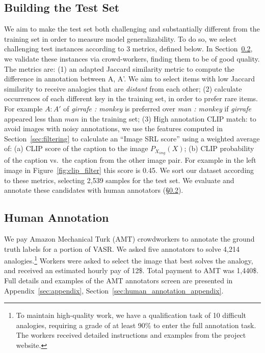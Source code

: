\documentclass[letterpaper]{article} \usepackage{aaai23}  \usepackage{times}  \usepackage{helvet}  \usepackage{courier}  \usepackage[hyphens]{url}  \usepackage{graphicx} \urlstyle{rm} \def\UrlFont{\rm}  \usepackage{natbib}  \usepackage{caption} \frenchspacing  \setlength{\pdfpagewidth}{8.5in}  \setlength{\pdfpageheight}{11in}  \usepackage{algorithm}
\begin{document}
\subsection{Building the Test Set}
\label{sec:candidates_gold}
We aim to make the test set both challenging and substantially different from the training set in order to measure model generalizability. To do so, we select challenging test instances according to 3 metrics, defined below. In Section~\ref{sec:mturk}, we validate these instances via crowd-workers, finding them to be of good quality.
The metrics are: (1) an adapted Jaccard similarity metric to compute the difference in annotation between A, A'. We aim to select items with low Jaccard similarity to receive analogies that are \emph{distant} from each other; (2) calculate occurrences of each different key in the training set, in order to prefer rare items. For example $A:A'$ of \textit{girrafe : monkey} is preferred over \textit{man : monkey} if \textit{girrafe} appeared less than $man$ in the training set; (3) High annotation CLIP match: to avoid images with noisy annotations, we use the features computed in Section~\ref{sec:filtering} to calculate an ``Image SRL score'' using a weighted average of: (a) CLIP score of the caption to the image $P_{X_{img}}(X)$; (b) CLIP probability of the caption vs.~the caption from the other image pair. For example in the left image in Figure~\ref{fig:clip_filter} this score is 0.45. 
We sort our dataset according to these metrics, selecting 2,539 samples for the test set. We evaluate and annotate these candidates with human annotators (\S\ref{sec:mturk}).

\subsection{Human Annotation}
\label{sec:mturk}
We pay Amazon Mechanical Turk (AMT) crowdworkers to annotate the ground truth labels for a portion of VASR. We asked five annotators to solve 4,214 analogies.\footnote{To maintain high-quality work, we have a qualification task of 10 difficult analogies, requiring a grade of at least 90\% to enter the full annotation task. The workers received detailed instructions and examples from the project website.} Workers were asked to select the image that best solves the analogy, and received an estimated hourly pay of 12\$. Total payment to AMT was 1,440\$. Full details and examples of the AMT annotators screen are presented in Appendix~\ref{sec:appendix}, Section~\ref{sec:human_annotation_appendix}.
\end{document}
